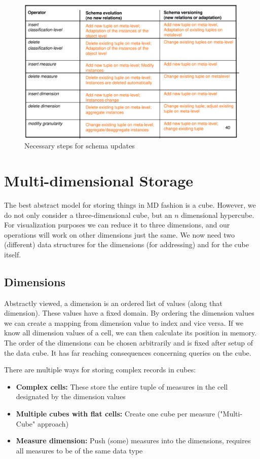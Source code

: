\documentclass{article}
\begin{document}
\begin{figure}[hp]
    \centering
    \includegraphics[width=\textwidth]{changes.png}
    \caption{Necessary steps for schema updates}
    \label{fig:changes}
\end{figure}

\section{Multi-dimensional Storage}
The best abstract model for storing things in MD fashion is a cube.
However, we do not only consider a three-dimensional cube, but an $n$ dimensional hypercube.
For visualization purposes we can reduce it to three dimensions, and our operations will work on other dimensions just the same.
We now need two (different) data structures for the dimensions (for addressing) and for the cube itself.

\subsection{Dimensions}
Abstractly viewed, a dimension is an ordered list of values (along that dimension).
These values have a fixed domain.
By ordering the dimension values we can create a mapping from dimension value to index and vice versa.
If we know all dimension values of a cell, we can then calculate its position in memory.
The order of the dimensions can be chosen arbitrarily and is fixed after setup of the data cube.
It has far reaching consequences concerning queries on the cube.

There are multiple ways for storing complex records in cubes:
\begin{itemize}
    \item \textbf{Complex cells:} These store the entire tuple of measures in the cell designated by the dimension values
    \item \textbf{Multiple cubes with flat cells:} Create one cube per measure ("Multi-Cube" approach)
    \item \textbf{Measure dimension:} Push (some) measures into the dimensions, requires all measures to be of the same data type
\end{itemize}
\end{document}
